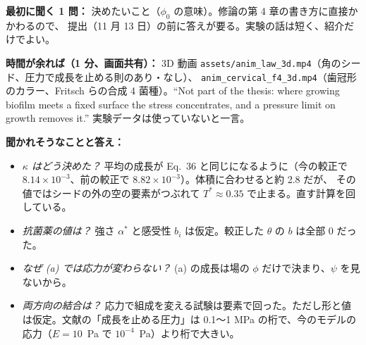 \documentclass[11pt,a4paper]{article}
\begin{document}
\vspace{8pt}
\noindent\textbf{最初に聞く 1 問：} 決めたいこと（$\phi_0$ の意味）。修論の第 4 章の書き方に直接かかわるので、
提出（11 月 13 日）の前に答えが要る。実験の話は短く、紹介だけでよい。

\vspace{4pt}
\noindent\textbf{時間が余れば（1 分、画面共有）：} 3D 動画 \texttt{assets/anim\_law\_3d.mp4}（角のシード、圧力で成長を止める則のあり・なし）、
\texttt{anim\_cervical\_f4\_3d.mp4}（歯冠形のカラー、Fritsch らの合成 4 菌種）。``Not part of the thesis: where growing biofilm meets a
fixed surface the stress concentrates, and a pressure limit on growth removes it.'' 実験データは使っていないと一言。

\vspace{4pt}
\noindent\textbf{聞かれそうなことと答え：}
\begin{itemize}
\item \emph{$\kappa$ はどう決めた？} 平均の成長が Eq.~36 と同じになるように（今の較正で $8.14\times10^{-3}$、前の較正で $8.82\times10^{-3}$）。体積に合わせると約 2.8 だが、
  その値ではシードの外の空の要素がつぶれて $T^*\approx0.35$ で止まる。直す計算を回している。
\item \emph{抗菌薬の値は？} 強さ $\alpha^*$ と感受性 $b_i$ は仮定。較正した $\theta$ の $b$ は全部 0 だった。
\item \emph{なぜ (a) では応力が変わらない？} (a) の成長は場の $\phi$ だけで決まり、$\psi$ を見ないから。
\item \emph{両方向の結合は？} 応力で組成を変える試験は要素で回った。ただし形と値は仮定。文献の「成長を止める圧力」は
  0.1〜1 MPa の桁で、今のモデルの応力（$E=10$~Pa で $10^{-4}$~Pa）より桁で大きい。
\end{itemize}
\end{document}
